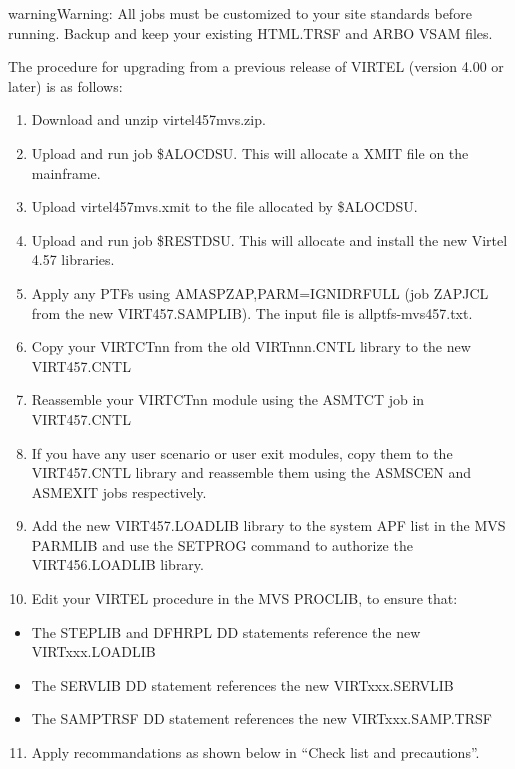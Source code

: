 \documentclass[letterpaper,10pt,english]{sphinxmanual}
\begin{document}
\begin{sphinxadmonition}{warning}{Warning:}
All jobs must be customized to your site standards before running. Backup and keep your existing HTML.TRSF and ARBO VSAM files.
\end{sphinxadmonition}

The procedure for upgrading from a previous release of VIRTEL (version 4.00 or later) is as follows:
\begin{enumerate}
\item {} 
Download and unzip virtel457mvs.zip.

\item {} 
Upload and run job \$ALOCDSU. This will allocate a XMIT file on the mainframe.

\item {} 
Upload virtel457mvs.xmit to the file allocated by \$ALOCDSU.

\item {} 
Upload and run job \$RESTDSU. This will allocate and install the new Virtel 4.57 libraries.

\item {} 
Apply any PTFs using AMASPZAP,PARM=IGNIDRFULL (job ZAPJCL from the new VIRT457.SAMPLIB). The input file is allptfs-mvs457.txt.

\item {} 
Copy your VIRTCTnn from the old VIRTnnn.CNTL library to the new VIRT457.CNTL

\item {} 
Reassemble your VIRTCTnn module using the ASMTCT job in VIRT457.CNTL

\item {} 
If you have any user scenario or user exit modules, copy them to the VIRT457.CNTL library and reassemble them using the ASMSCEN and ASMEXIT jobs respectively.

\item {} 
Add the new VIRT457.LOADLIB library to the system APF list in the MVS PARMLIB and use the SETPROG command to authorize the VIRT456.LOADLIB library.

\item {} 
Edit your VIRTEL procedure in the MVS PROCLIB, to ensure that:

\end{enumerate}
\begin{itemize}
\item {} 
The STEPLIB and DFHRPL DD statements reference the new VIRTxxx.LOADLIB

\item {} 
The SERVLIB DD statement references the new VIRTxxx.SERVLIB

\item {} 
The SAMPTRSF DD statement references the new VIRTxxx.SAMP.TRSF

\end{itemize}
\begin{enumerate}
\setcounter{enumi}{10}
\item {} 
Apply recommandations as shown below in “Check list and precautions”.

\end{enumerate}
\end{document}
